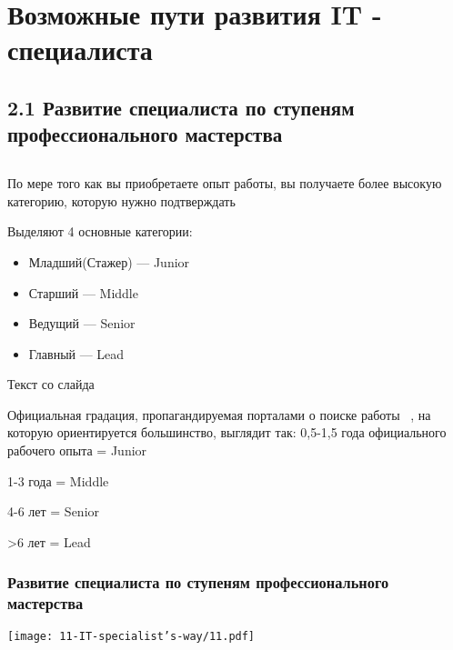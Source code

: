 \documentclass{../industrial-development}
\begin{document}

\section{Возможные пути развития IT - специалиста }

\subsection{2.1 Развитие  специалиста по ступеням профессионального мастерства }


\subsection{}

\begin{frame} \frametitle{}
  \begin{block}{}
  По мере того как вы приобретаете опыт работы, вы получаете более высокую категорию, которую нужно подтверждать
 \end{block}
\bigskip
Выделяют 4 основные категории:
  
  \begin{itemize}
  \item Младший(Стажер) --- Junior
  \item Старший --- Middle
  \item Ведущий --- Senior
 \item Главный --- Lead
  \end{itemize}
\end{frame}

\lecturenotes

Текст со слайда~\cite{JMSL}

Официальная градация, пропагандируемая порталами о поиске работы ~\cite{hh}, на которую ориентируется большинство, выглядит так:
	0,5-1,5 года официального рабочего опыта = Junior

	1-3 года = Middle 

	4-6 лет = Senior

	>6 лет = Lead


\begin{frame} \frametitle{Развитие  специалиста по ступеням профессионального мастерства}
 \centerline{\texttt{[image: 11-IT-specialist's-way/11.pdf]}}

\end{frame}
\end{document}
